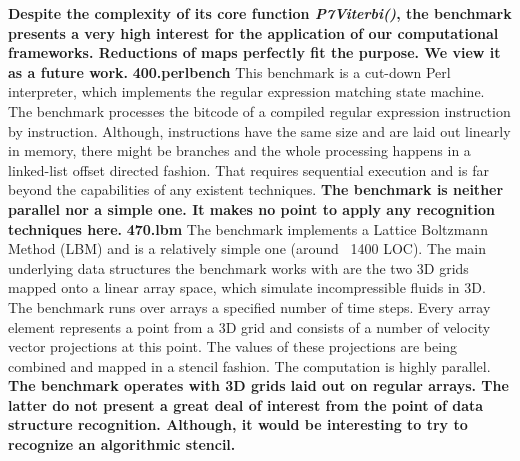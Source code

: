 \quad\textbf{Despite the complexity of its core function \textit{P7Viterbi()}, the benchmark presents a very high interest for the application of our computational frameworks. Reductions of maps perfectly fit the purpose. We view it as a future work.}\newline\null
\quad \textbf{400.perlbench} \quad This benchmark is a cut-down Perl interpreter, which implements the regular expression matching state machine. The benchmark processes the bitcode of a compiled regular expression instruction by instruction. Although, instructions have the same size and are laid out linearly in memory, there might be branches and the whole processing happens in a linked-list offset directed fashion. That requires sequential execution and is far beyond the capabilities of any existent techniques.\newline\null
\quad\textbf{The benchmark is neither parallel nor a simple one. It makes no point to apply any recognition techniques here.}\newline\null
\quad \textbf{470.lbm} \quad The benchmark implements a Lattice Boltzmann Method (LBM) and is a relatively simple one (around ~1400 LOC). The main underlying data structures the benchmark works with are the two 3D grids mapped onto a linear array space, which simulate incompressible fluids in 3D. The benchmark runs over arrays a specified number of time steps. Every array element represents a point from a 3D grid and consists of a number of velocity vector projections at this point. The values of these projections are being combined and mapped in a stencil fashion. The computation is highly parallel.\newline\null
\quad\textbf{The benchmark operates with 3D grids laid out on regular arrays. The latter do not present a great deal of interest from the point of data structure recognition. Although, it would be interesting to try to recognize an algorithmic stencil.}
